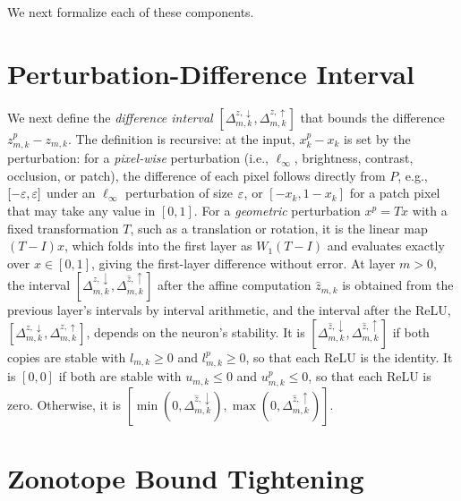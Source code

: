 We next formalize each of these components.

\section{Perturbation-Difference Interval}
\label{sec:blend-pert-diff}

We next define the \emph{difference interval}
$[\Delta^{z,\downarrow}_{m,k},\Delta^{z,\uparrow}_{m,k}]$ that bounds the difference $z^{p}_{m,k}-z_{m,k}$.
The definition is recursive: at the input, $x^{p}_k-x_k$ is set by
the perturbation: for a \emph{pixel-wise} perturbation (i.e., $\ell_\infty$, brightness, contrast, occlusion, or
patch), the difference
of each pixel follows directly from $P$, e.g., $[-\varepsilon,\varepsilon]$ under an $\ell_\infty$ perturbation of size $\varepsilon$, or $[-x_k,1-x_k]$
for a patch pixel that may take any value in $[0,1]$. For a
\emph{geometric} perturbation $x^{p}=Tx$ with a fixed transformation $T$, such as a translation or rotation, it is the linear map
$(T-I)x$, which \tool folds into the first layer as $W_1(T-I)$ and evaluates exactly over $x\in[0,1]$,
giving the first-layer difference without error. At layer $m>0$, the interval
$[\Delta^{\hat z,\downarrow}_{m,k},\Delta^{\hat z,\uparrow}_{m,k}]$ after the affine computation
$\hat z_{m,k}$ is obtained from the previous layer's intervals by interval arithmetic, and the interval
after the ReLU, $[\Delta^{z,\downarrow}_{m,k},\Delta^{z,\uparrow}_{m,k}]$, depends on the neuron's
stability. It is $[\Delta^{\hat z,\downarrow}_{m,k},\Delta^{\hat z,\uparrow}_{m,k}]$ if both copies are
stable with $l_{m,k}\ge 0$ and $l^{p}_{m,k}\ge 0$, so that each ReLU is the identity. It is
$[0,0]$ if both are stable with $u_{m,k}\le 0$ and $u^{p}_{m,k}\le 0$, so that each ReLU is zero. Otherwise,
it is $[\min(0,\Delta^{\hat z,\downarrow}_{m,k}),\max(0,\Delta^{\hat z,\uparrow}_{m,k})]$.


\section{Zonotope Bound Tightening}
\label{sec:blend-zonotope}

